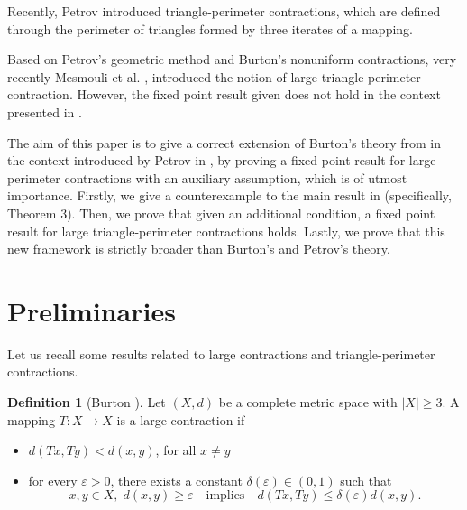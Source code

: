 \documentclass[12 pt]{article}
\theoremstyle{lema}
\theoremstyle{proposition}
\theoremstyle{theorem}
\theoremstyle{theorem}
\theoremstyle{corollary}
\theoremstyle{definition}
\newtheorem{definition}{Definition}[section]
\theoremstyle{example}
\begin{document}
	Recently, Petrov \cite{Petrov} introduced triangle-perimeter contractions, which are defined through the perimeter of triangles formed by three iterates of a mapping.
	
	Based on Petrov's geometric method and Burton's nonuniform contractions, very recently Mesmouli et al. \cite{Mesmouli}, introduced the notion of large triangle-perimeter contraction. However, the fixed point result given does not hold in the context presented in \cite{Mesmouli}.
	
	The aim of this paper is to give a correct extension of Burton's theory  from \cite{Burton2} in the context introduced by Petrov in \cite{Petrov}, by proving a fixed point result for large-perimeter contractions with an auxiliary assumption, which is of utmost importance. Firstly, we give a counterexample to the main result in \cite{Mesmouli} (specifically, Theorem 3). Then, we prove that given an additional condition, a fixed point result for large triangle-perimeter contractions holds. Lastly, we prove that this new framework is strictly broader than Burton's and Petrov's theory.
	
	
	
	\section{Preliminaries}
	
	
	Let us recall some results related to large contractions and triangle-perimeter contractions.
	
	\begin{definition}[Burton \cite{Burton2}]
		Let \((X,d)\) be a complete metric space with \(|X| \geq 3\). A mapping \(T : X \to X \) is a large contraction if 
		\begin{itemize}
			\item[1)] \(d(Tx,Ty) < d(x,y)\), for all \(x \neq y\)
			\item[2)] for every \(\varepsilon > 0\), there exists a constant \(\delta(\varepsilon) \in (0,1)\) such that 
			\begin{equation*}
			x,y \in X, \; d(x,y) \geq \varepsilon \quad \text{implies} \quad d(Tx,Ty) \leq\delta(\varepsilon) d(x,y).
			\label{*}
			\end{equation*}
		\end{itemize} 
	\end{definition}
\end{document}
